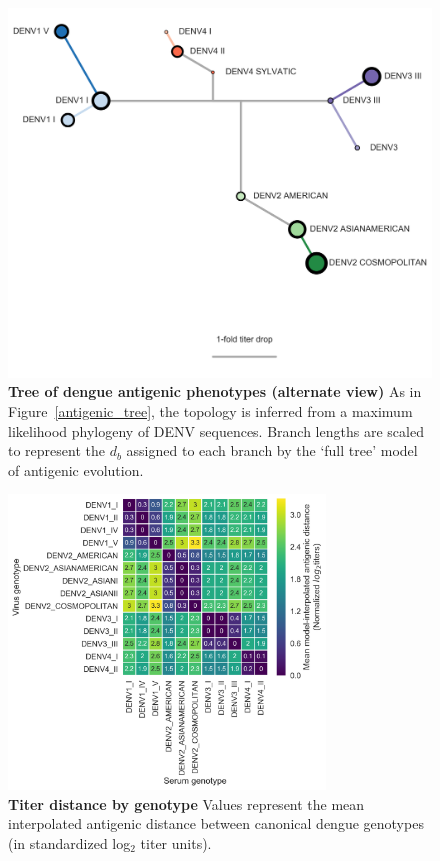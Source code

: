 \begin{figure}[h!]
  \centering
  \includegraphics[width=\textwidth]{./png/antigenic_tree_supplement.png}
  \caption[Tree of dengue antigenic phenotypes (alternate view)]{\textbf{Tree of dengue antigenic phenotypes (alternate view) }
As in Figure~\ref{antigenic_tree}, the topology is inferred from a maximum likelihood phylogeny of DENV sequences.
Branch lengths are scaled to represent the $d_b$ assigned to each branch by the `full tree' model of antigenic evolution.
  }
\label{antigenic_tree_supplement}
\end{figure}

\begin{figure}[h!]
\centering
	\includegraphics[width=0.75\textwidth]{./png/genotype_dTiter_heatmap.png}
	\caption[Titer distance by genotype]{\textbf{Titer distance by genotype }
  Values represent the mean interpolated antigenic distance between canonical dengue genotypes (in standardized log$_2$ titer units).
  }
	\label{genotype_dTiter_heatmap}
\end{figure}





